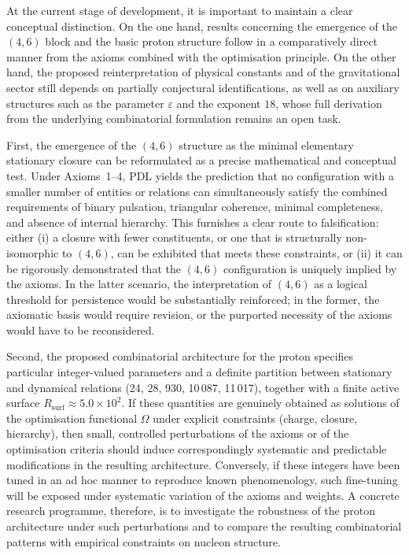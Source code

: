 \documentclass[11pt,a4paper]{article}
\begin{document}
At the current stage of development, it is important to maintain a clear conceptual distinction. On the one hand, results concerning the emergence of the $(4,6)$ block and the basic proton structure follow in a comparatively direct manner from the axioms combined with the optimisation principle. On the other hand, the proposed reinterpretation of physical constants and of the gravitational sector still depends on partially conjectural identifications, as well as on auxiliary structures such as the parameter $\varepsilon$ and the exponent $18$, whose full derivation from the underlying combinatorial formulation remains an open task.

First, the emergence of the \((4,6)\) structure as the minimal elementary stationary closure can be reformulated as a precise mathematical and conceptual test. Under Axioms~1–4, PDL yields the prediction that no configuration with a smaller number of entities or relations can simultaneously satisfy the combined requirements of binary pulsation, triangular coherence, minimal completeness, and absence of internal hierarchy. This furnishes a clear route to falsification: either (i) a closure with fewer constituents, or one that is structurally non-isomorphic to \((4,6)\), can be exhibited that meets these constraints, or (ii) it can be rigorously demonstrated that the \((4,6)\) configuration is uniquely implied by the axioms. In the latter scenario, the interpretation of \((4,6)\) as a logical threshold for persistence would be substantially reinforced; in the former, the axiomatic basis would require revision, or the purported necessity of the axioms would have to be reconsidered.

Second, the proposed combinatorial architecture for the proton specifies particular integer-valued parameters and a definite partition between stationary and dynamical relations (24, 28, 930, 10\,087, 11\,017), together with a finite active surface \(R_{\text{surf}} \approx 5.0 \times 10^2\). If these quantities are genuinely obtained as solutions of the optimisation functional \(\Omega\) under explicit constraints (charge, closure, hierarchy), then small, controlled perturbations of the axioms or of the optimisation criteria should induce correspondingly systematic and predictable modifications in the resulting architecture. Conversely, if these integers have been tuned in an ad hoc manner to reproduce known phenomenology, such fine-tuning will be exposed under systematic variation of the axioms and weights. A concrete research programme, therefore, is to investigate the robustness of the proton architecture under such perturbations and to compare the resulting combinatorial patterns with empirical constraints on nucleon structure.
\end{document}
